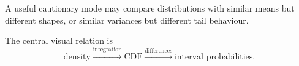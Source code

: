 A useful cautionary mode may compare distributions with similar means but different shapes, or similar variances but different tail behaviour.

\begin{summarybox}
The central visual relation is
\[
\text{density}
\xrightarrow{\text{integration}}
\text{CDF}
\xrightarrow{\text{differences}}
\text{interval probabilities}.
\]
\end{summarybox}
